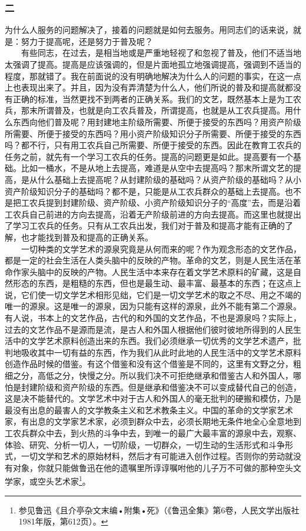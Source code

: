 \documentclass[cn,11pt,chinese]{elegantbook}
\def\myformat#1{\hfil\hfil #1}
\begin{document}
\subsubsection*{\myformat{二}}
为什么人服务的问题解决了，接着的问题就是如何去服务。用同志们的话来说，就是：努力于提高呢，还是努力于普及呢？\\
　　有些同志，在过去，是相当地或是严重地轻视了和忽视了普及，他们不适当地太强调了提高。提高是应该强调的，但是片面地孤立地强调提高，强调到不适当的程度，那就错了。我在前面说的没有明确地解决为什么人的问题的事实，在这一点上也表现出来了。并且，因为没有弄清楚为什么人，他们所说的普及和提高就都没有正确的标准，当然更找不到两者的正确关系。我们的文艺，既然基本上是为工农兵，那末所谓普及，也就是向工农兵普及，所谓提高，也就是从工农兵提高。用什么东西向他们普及呢？用封建地主阶级所需要、所便于接受的东西吗？用资产阶级所需要、所便于接受的东西吗？用小资产阶级知识分子所需要、所便于接受的东西吗？都不行，只有用工农兵自己所需要、所便于接受的东西。因此在教育工农兵的任务之前，就先有一个学习工农兵的任务。提高的问题更是如此。提高要有一个基础。比如一桶水，不是从地上去提高，难道是从空中去提高吗？那末所谓文艺的提高，是从什么基础上去提高呢？从封建阶级的基础吗？从资产阶级的基础吗？从小资产阶级知识分子的基础吗？都不是，只能是从工农兵群众的基础上去提高。也不是把工农兵提到封建阶级、资产阶级、小资产阶级知识分子的“高度”去，而是沿着工农兵自己前进的方向去提高，沿着无产阶级前进的方向去提高。而这里也就提出了学习工农兵的任务。只有从工农兵出发，我们对于普及和提高才能有正确的了解，也才能找到普及和提高的正确关系。\\
　　一切种类的文学艺术的源泉究竟是从何而来的呢？作为观念形态的文艺作品，都是一定的社会生活在人类头脑中的反映的产物。革命的文艺，则是人民生活在革命作家头脑中的反映的产物。人民生活中本来存在着文学艺术原料的矿藏，这是自然形态的东西，是粗糙的东西，但也是最生动、最丰富、最基本的东西；在这点上说，它们使一切文学艺术相形见绌，它们是一切文学艺术的取之不尽、用之不竭的唯一的源泉。这是唯一的源泉，因为只能有这样的源泉，此外不能有第二个源泉。有人说，书本上的文艺作品，古代的和外国的文艺作品，不也是源泉吗？实际上，过去的文艺作品不是源而是流，是古人和外国人根据他们彼时彼地所得到的人民生活中的文学艺术原料创造出来的东西。我们必须继承一切优秀的文学艺术遗产，批判地吸收其中一切有益的东西，作为我们从此时此地的人民生活中的文学艺术原料创造作品时候的借鉴。有这个借鉴和没有这个借鉴是不同的，这里有文野之分，粗细之分，高低之分，快慢之分。所以我们决不可拒绝继承和借鉴古人和外国人，哪怕是封建阶级和资产阶级的东西。但是继承和借鉴决不可以变成替代自己的创造，这是决不能替代的。文学艺术中对于古人和外国人的毫无批判的硬搬和模仿，乃是最没有出息的最害人的文学教条主义和艺术教条主义。中国的革命的文学家艺术家，有出息的文学家艺术家，必须到群众中去，必须长期地无条件地全心全意地到工农兵群众中去，到火热的斗争中去，到唯一的最广大最丰富的源泉中去，观察、体验、研究、分析一切人，一切阶级，一切群众，一切生动的生活形式和斗争形式，一切文学和艺术的原始材料，然后才有可能进入创作过程。否则你的劳动就没有对象，你就只能做鲁迅在他的遗嘱里所谆谆嘱咐他的儿子万不可做的那种空头文学家，或空头艺术家\footnote[6]{ 参见鲁迅《且介亭杂文末编•附集•死》（《鲁迅全集》第6卷，人民文学出版社1981年版，第612页）。}。\\
\end{document}

